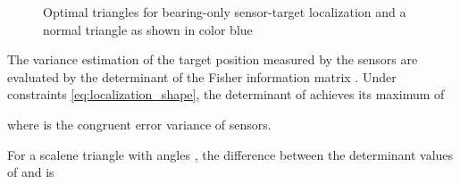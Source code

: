 \documentclass[times]{rncauth}
\begin{document}
\begin{figure}
\caption{Optimal triangles for bearing-only sensor-target
localization and a normal triangle as shown in color
blue}\label{fig:optimal_triangles}
\end{figure}



The variance estimation of the  target position measured by the
sensors are evaluated by the determinant of the Fisher information
matrix . Under constraints \eqref{eq:localization_shape},
the determinant of  achieves its maximum
of\cite{Bishop10sensor}

where  is the congruent error variance of sensors.

For a scalene triangle with angles , the difference
between the determinant values of  and
 is
\end{document}
